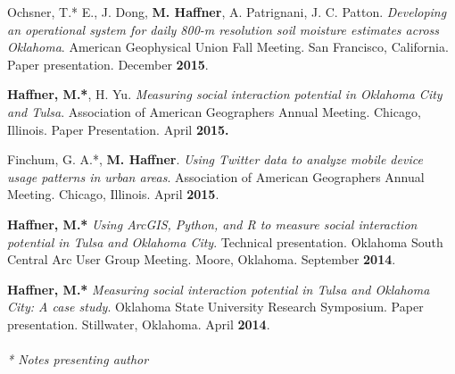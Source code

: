 \begin{cventries}
{\begin{cvitems}
            \item {Ochsner, T.* E., J. Dong, \textbf{M. Haffner}, A. Patrignani, J. C. Patton. \textit{Developing an operational system for daily 800-m resolution soil moisture estimates across Oklahoma}. American Geophysical Union Fall Meeting. San Francisco, California. Paper presentation. December \textbf{2015}.} 
            \end{cvitems}
            }
   \cventry
      {}
      {}
      {}
      {}
      {
        \begin{cvitems}
          \vspace{-2mm}
            \item {\textbf{Haffner, M.*}, H. Yu. \textit{Measuring social interaction potential in Oklahoma City and Tulsa}. Association of American Geographers Annual Meeting. Chicago, Illinois. Paper Presentation. April \textbf{2015.}} 
              \end{cvitems}
              }
   \cventry
      {}
      {}
      {}
      {}
      {
        \begin{cvitems}
          \vspace{-2mm}
            \item {Finchum, G. A.*, \textbf{M. Haffner}. \textit{Using Twitter data to analyze mobile device usage patterns in urban areas}. Association of American Geographers Annual Meeting. Chicago, Illinois. April \textbf{2015}.}  
              \end{cvitems}
            }
   \cventry
      {}
      {}
      {}
      {}
      {
        \begin{cvitems}
          \vspace{-2mm}
            \item {\textbf{Haffner, M.*} \textit{Using ArcGIS, Python, and R to measure social interaction potential in Tulsa and Oklahoma City}. Technical presentation. Oklahoma South Central Arc User Group Meeting. Moore, Oklahoma. September \textbf{2014}.} 
            \end{cvitems}
            }
   \cventry
      {}
      {}
      {}
      {}
      {
        \begin{cvitems}
          \vspace{-2mm}
            \item {\textbf{Haffner, M.*} \textit{Measuring social interaction potential in Tulsa and Oklahoma City: A case study}. Oklahoma State University Research Symposium. Paper presentation. Stillwater, Oklahoma. April \textbf{2014}.} \\\\
            \textit{* Notes presenting author}
              \end{cvitems}
            }
\end{cventries}